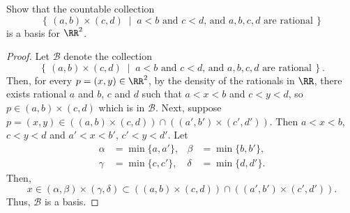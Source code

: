 \begin{problem}[Munkres, \S16, 6.]
Show that the countable collection
\[
\left\{\,(a,b)\times(c,d)\;\middle|\;
\text{$a<b$ and $c<d$, and $a,b,c,d$ are rational}\,\right\}
\]
is a basis for $\RR^2$.
\end{problem}
\begin{proof}
Let $\mathcal{B}$ denote the collection
\[
\left\{\,(a,b)\times(c,d)\;\middle|\;
\text{$a<b$ and $c<d$, and $a,b,c,d$ are rational}\,\right\}.
\]
Then, for every $p=(x,y)\in\RR^2$, by the density of the
rationals in $\RR$, there exists rational $a$ and $b$, $c$ and
$d$ such that $a<x<b$ and $c<y<d$, so $p\in (a,b)\times (c,d)$
which is in $\mathcal{B}$. Next, suppose $p=(x,y)\in
\left((a,b)\times(c,d)\right) \cap \left((a',b')\times
  (c',d')\right)$. Then $a<x<b$, $c<y<d$ and $a'<x<b'$,
$c'<y<d'$. Let
\begin{align*}
\alpha&=\min\{a,a'\},&\beta&=\min\{b,b'\},\\
\gamma&=\min\{c,c'\},&\delta&=\min\{d,d'\}.
\end{align*}
Then,
\[
x\in(\alpha,\beta)\times(\gamma,\delta)\subset\left((a,b)\times(c,d)\right)\cap\left((a',b')\times(c',d')\right).
\]
Thus, $\mathcal{B}$ is a basis.
\end{proof}
\newpage

